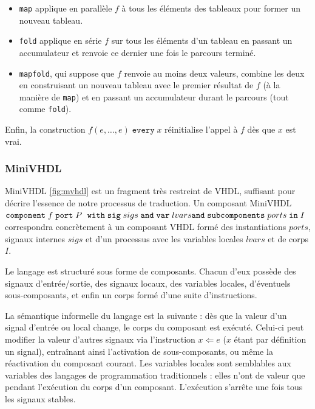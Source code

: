 \documentclass[a4paper]{article}
\newcommand{\mybox}[1]{\mbox{\tt{#1}}}
\newcommand{\Component}[6]{\mybox{component} \; #1 \; \mybox{port} \; #2 \; \
  \mybox{with} \; \mybox{sig} \; #3 \; \mybox{and} \; \mybox{var} \; #4 \; \\
  \mybox{and} \; \mybox{subcomponents} \; #5 \; \mybox{in} \; #6}
\begin{document}
\begin{itemize}
\item \texttt{map} applique en parallèle $f$ à tous les éléments des tableaux
  pour former un nouveau tableau.
\item \texttt{fold} applique en série $f$ sur tous les éléments d'un tableau en
  passant un accumulateur et renvoie ce dernier une fois le parcours terminé.
\item \texttt{mapfold}, qui suppose que $f$ renvoie au moins deux valeurs,
  combine les deux en construisant un nouveau tableau avec le premier résultat
  de $f$ (à la manière de \texttt{map}) et en passant un accumulateur durant le
  parcours (tout comme \texttt{fold}).
\end{itemize}

Enfin, la construction $f(e,\dots,e) \; \mathtt{every} \; x$ réinitialise
l'appel à $f$ dès que $x$ est vrai.

\subsubsection{MiniVHDL}

MiniVHDL \ref{fig:mvhdl} est un fragment tr\`es restreint de VHDL, suffisant pour
d\'ecrire l'essence de notre processus de traduction. Un composant MiniVHDL
$\Component{f}{P}{sigs}{lvars}{ports}{I}$ correspondra concr\`etement \`a un
composant VHDL form\'e des instantiations $ports$, signaux internes $sigs$ et d'un
processus avec les variables locales $lvars$ et de corps $I$.

Le langage est structuré sous forme de composants. Chacun d'eux possède des
signaux d'entrée/sortie, des signaux locaux, des variables locales, d'éventuels
sous-composants, et enfin un corps formé d'une suite d'instructions.

La sémantique informelle du langage est la suivante : dès que la valeur d'un
signal d'entrée ou local change, le corps du composant est exécuté. Celui-ci
peut modifier la valeur d'autres signaux via l'instruction $x \Leftarrow e$ ($x$
étant par définition un signal), entraînant ainsi l'activation de
sous-composants, ou même la réactivation du composant courant. Les variables
locales sont semblables aux variables des langages de programmation
traditionnels : elles n'ont de valeur que pendant l'exécution du corps d'un
composant. L'exécution s'arrête une fois tous les signaux stables.
\end{document}
